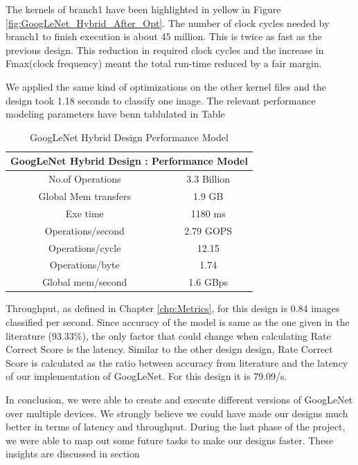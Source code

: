 The kernels of branch1 have been highlighted in yellow in Figure \ref{fig:GoogLeNet_Hybrid_After_Opt}. The number of clock cycles needed by branch1 to finish execution is about 45 million. This is twice as fast as the previous design. This reduction in required clock cycles and the increase in Fmax(clock frequency) meant the total run-time reduced by a fair margin.

We applied the same kind of optimizations on the other kernel files and the design took 1.18 seconds to classify one image. The relevant performance modeling parameters have benn tablulated in Table 


\begin{table}[!htb]                          
 \centering
    \begin{tabular}{|c|c|}
    \multicolumn{2}{c}{\textbf{GoogLeNet Hybrid Design : Performance Model}} \\ \hline

     No.of Operations    &   3.3 Billion \\ \hline
      Global Mem transfers &   1.9 GB            \\ \hline          
      Exe time    &  1180 ms    \\ \hline
      Operations/second   &   2.79 GOPS \\ \hline
      Operations/cycle &   12.15             \\ \hline
      Operations/byte       &   1.74 \\ \hline
      Global mem/second & 1.6 GBps  \\ \hline

    \end{tabular}
    \caption{GoogLeNet Hybrid Design Performance Model}
    \label{tab:GoogLeNetHybridPerfModel}                            

\end{table} 


Throughput, as defined in Chapter \ref{chp:Metrics}, for this design is 0.84 images classified per second. Since accuracy of the model is same as the one given in the literature (93.33\%), the only factor that could change when calculating Rate Correct Score is the latency. Similar to the other design design, Rate Correct Score is calculated as the ratio between accuracy from literature and the latency of our implementation of GoogLeNet. For this design it is 79.09/s.

In conclusion, we were able to create and execute different versions of GoogLeNet over multiple devices. We strongly believe we could have made our designs much better in terms of latency and throughput. During the last phase of the project, we were able to map out some future tasks to make our designs faster. These insights are discussed in section 





